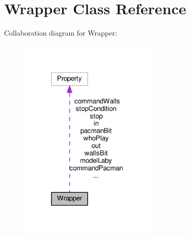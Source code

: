 \hypertarget{class_wrapper}{}\section{Wrapper Class Reference}
\label{class_wrapper}


Collaboration diagram for Wrapper\+:\nopagebreak
\begin{figure}[H]
\begin{center}
\leavevmode
\includegraphics[width=186pt]{class_wrapper__coll__graph}
\end{center}
\end{figure}
